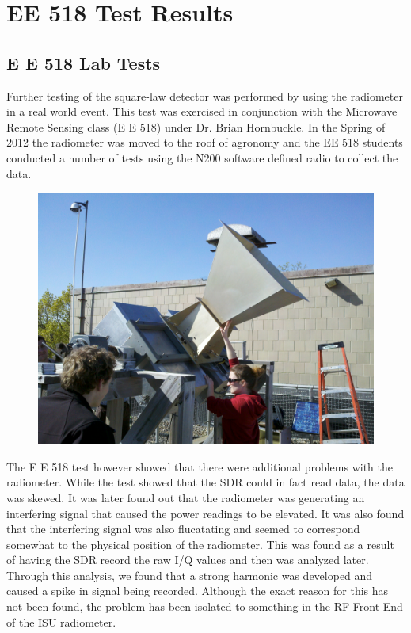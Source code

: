 \chapter{EE 518 Test Results}

\section*{E E 518 Lab Tests}

Further testing of the square-law detector was performed by using the radiometer in a real world event.  This test was exercised in conjunction with the Microwave Remote Sensing class (E E 518) under Dr. Brian Hornbuckle.  In the Spring of 2012 the radiometer was moved to the roof of agronomy and the EE 518 students conducted a number of tests using the N200 software defined radio to collect the data.


{\begin{figure}[h!tb] 
\centering
\includegraphics[width=\textwidth]{Images/radiometer_roof.jpg}
\label{radiometer_roof}
\end{figure}
}

The E E 518 test however showed that there were additional problems with the radiometer.  While the test showed that the SDR could in fact read data, the data was skewed.  It was later found out that the radiometer was generating an interfering signal that caused the power readings to be elevated.  It was also found that the interfering signal was also flucatating and seemed to correspond somewhat to the physical position of the radiometer.  This was found as a result of having the SDR record the raw I/Q values and then was analyzed later.  Through this analysis, we found that a strong harmonic was developed and caused a spike in signal being recorded.  Although the exact reason for this has not been found, the problem has been isolated to something in the RF Front End of the ISU radiometer. 


